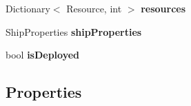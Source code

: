\begin{DoxyCompactItemize}
\item 
\hypertarget{class_ship_a36a4e89e389b90b28cc4f04db9b80ab4}{}Dictionary$<$ Resource, int $>$ {\bfseries resources}\label{class_ship_a36a4e89e389b90b28cc4f04db9b80ab4}

\item 
\hypertarget{class_ship_ad433e5693f803ea54b41180eae929eab}{}Ship\+Properties {\bfseries ship\+Properties}\label{class_ship_ad433e5693f803ea54b41180eae929eab}

\item 
\hypertarget{class_ship_a19055edd019236d0c49352723fe0f268}{}bool {\bfseries is\+Deployed}\label{class_ship_a19055edd019236d0c49352723fe0f268}

\end{DoxyCompactItemize}
\subsection*{Properties}
